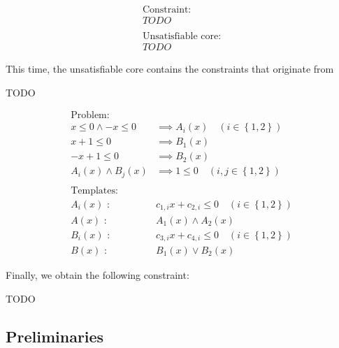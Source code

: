 \documentclass[a4paper,12pt]{article}
\begin{document}
\begin{align*}
\text{Constraint:} \\
TODO \\
\\
\text{Unsatisfiable core:} \\
TODO
\end{align*}

This time, the unsatisfiable core contains the constraints that
originate from

TODO

\begin{align*}
\text{Problem:} \\
x \leq 0 \wedge -x \leq 0 & \implies A_i(x) \quad (i \in \left\lbrace 1,2 \right\rbrace ) \\
x+1 \leq 0 & \implies B_1(x) \\
-x+1 \leq 0 & \implies B_2(x) \\
A_i(x) \wedge B_j(x) & \implies 1 \leq 0 \quad (i,j \in \left\lbrace 1,2 \right\rbrace ) \\
\\
\text{Templates:} \\
A_i(x) \text{ : } & c_{1,i} x + c_{2,i} \leq 0 \quad (i \in \left\lbrace 1,2 \right\rbrace ) \\
A(x) \text{ : } & A_1(x) \wedge A_2(x) \\
B_i(x) \text{ : } & c_{3,i} x + c_{4,i} \leq 0 \quad (i \in \left\lbrace 1,2 \right\rbrace ) \\
B(x) \text{ : } & B_1(x) \vee B_2(x)
\end{align*}

Finally, we obtain the following constraint:

TODO

\subsection{Preliminaries}
\end{document}

